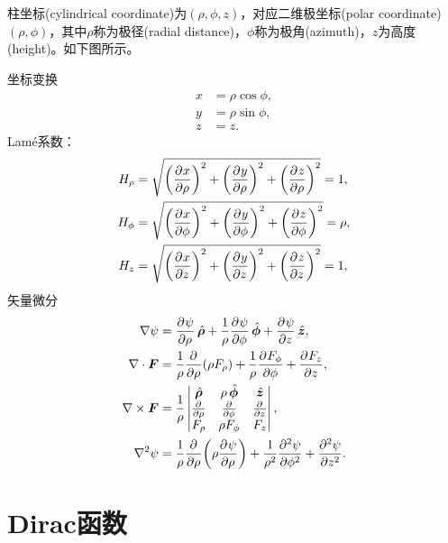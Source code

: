 柱坐标(cylindrical coordinate)为$(\rho,\phi,z)$，对应二维极坐标(polar coordinate) $(\rho,\phi)$，其中$\rho$称为极径(radial distance)，$\phi$称为极角(azimuth)，$z$为高度(height)。如下图所示。
\begin{notecaptionblock}
    \label{fig:cylindrical coordinate}
\end{notecaptionblock}
坐标变换
\begin{subequations}
    \begin{align}
        x &= \rho\cos\phi,\\
        y &= \rho\sin\phi,\\
        z &= z.
    \end{align}
\end{subequations}
Lam\'e系数：
\begin{subequations}
    \begin{align}
        H_\rho &= \sqrt{\biggp{\pv x\rho}^2 + \biggp{\pv y\rho}^2 + \biggp{\pv z\rho}^2} = 1,\\
        H_\phi &= \sqrt{\biggp{\pv x\phi}^2 + \biggp{\pv y\phi}^2 + \biggp{\pv z\phi}^2} = \rho,\\
        H_z &= \sqrt{\biggp{\pv xz}^2 + \biggp{\pv yz}^2 + \biggp{\pv zz}^2} = 1,
    \end{align}
\end{subequations}
矢量微分
\begin{align}
    \grad\psi &= \pv\psi\rho\uvec\rho + \frac1\rho\pv\psi\phi\uvec\phi + \pv\psi z\uvec z,\\
    \div\bm F &= \frac1\rho\pp\rho(\rho F_\rho) + \frac1\rho\pv{F_\phi}\phi + \pv{F_z}z,\\
    \curl\bm F &= \frac1\rho
    \begin{vmatrix}
        \uvec\rho&\rho\uvec\phi&\uvec z\\
        \pp\rho&\pp\phi&\pp z\\
        F_\rho&\rho F_\phi&F_z
    \end{vmatrix},\\
    \laplacian\psi &= \frac1\rho\pp\rho\biggp{\rho\pv\psi\rho} + \frac1{\rho^2}\pv[2]\psi\phi + \pv[2]\psi z.
\end{align}

\section{Dirac函数}

